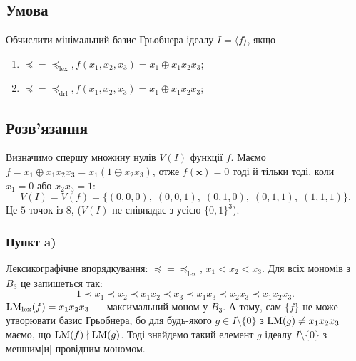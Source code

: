 \chapter{}
\label{chap:1}

\section{Умова}

Обчислити мінімальний базис Грьобнера ідеалу $I = \langle f \rangle$, якщо
\begin{enumerate}[label=\alph*)]
    \item $\preceq = \preceq_{\text{lex}}, f (x_{1}, x_{2}, x_{3}) = x_{1} \oplus x_{1}x_{2}x_{3}$;
    \item $\preceq = \preceq_{\text{drl}}, f (x_{1}, x_{2}, x_{3}) = x_{1} \oplus x_{1}x_{2}x_{3}$;
\end{enumerate}

\section{Розв'язання}

Визначимо спершу множину нулів $V(I)$ функції $f$.
Маємо $f = x_{1} \oplus x_{1}x_{2}x_{3} = x_1(1 \oplus x_2 x_3)$, отже $f(\mathbf{x}) = 0$ тоді й тільки тоді,
коли $x_1 = 0$ або $x_2 x_3 = 1$:
\begin{equation*}
    V(I) = V(f) = \big\{(0,0,0),\; (0,0,1),\; (0,1,0),\; (0,1,1),\; (1,1,1)\big\}.
\end{equation*}
Це $5$ точок із $8$, ($V(I)$ не співпадає з усією $\{0,1\}^3$).

\subsection{Пункт a)}
Лексикографічне впорядкування:
$\preceq = \preceq_{\mathrm{lex}}$, $x_1 < x_2 < x_3$. Для всіх мономів з $B_3$ це запишеться так:
\begin{equation*}
    1 \prec x_1 \prec x_2 \prec x_1 x_2 \prec x_3 \prec x_1 x_3 \prec x_2 x_3 \prec x_1 x_2 x_3.
\end{equation*}
$\mathrm{LM}_{\mathrm{lex}}(f) = x_1 x_2 x_3$ --- максимальний моном у $B_3$. А тому, сам $\{f\}$ не може утворювати базис 
Грьобнера, бо для будь-якого $g \in I \setminus \{0\}$ з $\mathrm{LM}(g) \neq x_1 x_2 x_3$ маємо, що $\mathrm{LM}(f) \nmid \mathrm{LM}(g)$. 
Тоді знайдемо такий елемент $g$ ідеалу $I \setminus \{0\}$ з меншим[и] провідним мономом.

